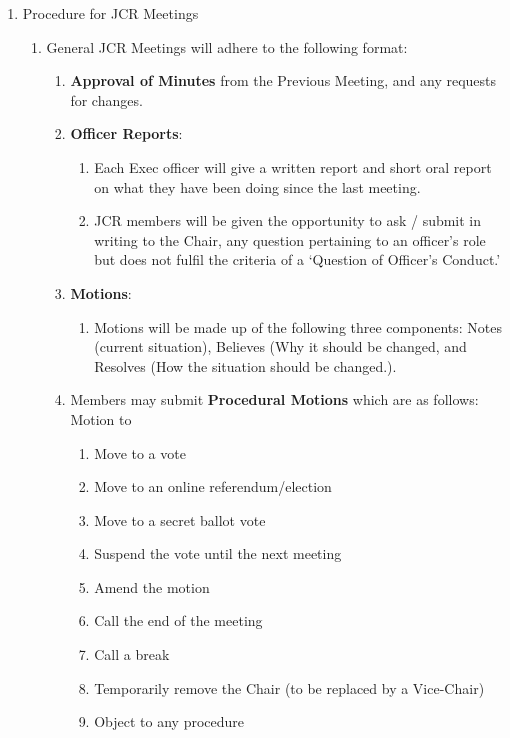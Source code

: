 \begin{enumerate}
    \item Procedure for JCR Meetings
    \begin{enumerate}
        \item General JCR Meetings will adhere to the following format:
        \begin{enumerate}
            \item \textbf{Approval of Minutes} from the Previous Meeting, and any requests for changes.
            \item \textbf{Officer Reports}:
            \begin{enumerate}
                \item Each Exec officer will give a written report and short oral report on what
                they have been doing since the last meeting.
                \item JCR members will be given the opportunity to ask / submit in writing to the Chair, any question pertaining to an officer’s role but does not fulfil the criteria of a ‘Question of Officer’s Conduct.’
            \end{enumerate}
            \item \textbf{Motions}:
            \begin{enumerate}
                \item Motions will be made up of the following three components: Notes (current situation), Believes (Why it should be changed, and Resolves (How the situation should be changed.).
            \end{enumerate}
            \item Members may submit \textbf{Procedural Motions} which are as follows: Motion to
            \begin{enumerate}
                \item Move to a vote
                \item Move to an online referendum/election
                \item Move to a secret ballot vote
                \item Suspend the vote until the next meeting
                \item Amend the motion
                \item Call the end of the meeting
                \item Call a break
                \item Temporarily remove the Chair (to be replaced by a Vice-Chair)
                \item Object to any procedure

\end{enumerate}
\end{enumerate}
\end{enumerate}
\end{enumerate}
